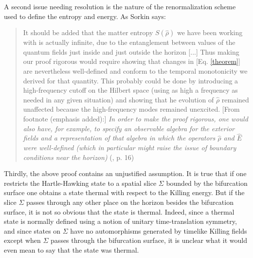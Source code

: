 \documentclass{article}
\begin{document}
A second issue needing resolution is the nature of the renormalization scheme used to define the entropy and energy.  As Sorkin says: 
\begin{quote}\small
It should be added that the matter entropy $S(\hat{\rho})$ we have been working with is actually infinite, due to the entanglement between values of the quantum fields just inside and just outside the horizon [...] Thus making our proof rigorous would require showing that changes in [Eq. \ref{theorem}] are nevertheless well-defined and conform to the temporal monotonicity we derived for that quantity. This probably could be done by introducing a high-frequency cutoff on the Hilbert space (using as high a frequency as needed in any given situation) and showing that he evolution of $\hat{\rho}$ remained unaffected because the high-frequency modes remained unexcited.  [From footnote (emphasis added):] \emph{In order to make the proof rigorous, one would also have, for example, to specify an observable algebra for the exterior fields and a representation of that algebra in which the operators $\hat{\rho}$ and $\hat{E}$ were well-defined (which in particular might raise the issue of boundary conditions near the horizon)}  (\cite{sorkin98}, p. 16)
\end{quote}

Thirdly, the above proof contains an unjustified assumption.  It is true that if one restricts the Hartle-Hawking state to a spatial slice $\Sigma$ bounded by the bifurcation surface one obtains a state thermal with respect to the Killing energy.  But if the slice $\Sigma$ passes through any other place on the horizon besides the bifurcation surface, it is not so obvious that the state is thermal.  Indeed, since a thermal state is normally defined using a notion of unitary time-translation symmetry, and since states on $\Sigma$ have no automorphisms generated by timelike Killing fields except when $\Sigma$ passes through the bifurcation surface, it is unclear what it would even mean to say that the state was thermal.
\end{document}
